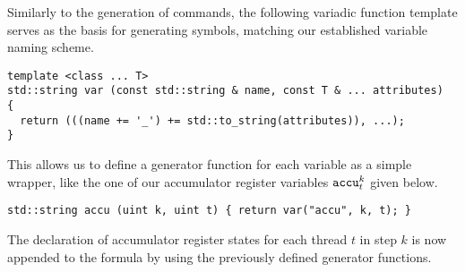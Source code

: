 
%

\noindent
Similarly to the generation of {\SMTLIB} commands, the following variadic function template serves as the basis for generating symbols, matching our established variable naming scheme.

\begin{lstlisting}[style=c++]
template <class ... T>
std::string var (const std::string & name, const T & ... attributes)
{
  return (((name += '_') += std::to_string(attributes)), ...);
}
\end{lstlisting}

\noindent
This allows us to define a generator function for each variable as a simple wrapper, %
like the one of our accumulator register variables $\texttt{accu}^k_t$ given below.



\begin{lstlisting}[style=c++]
std::string accu (uint k, uint t) { return var("accu", k, t); }
\end{lstlisting}

\noindent
The declaration of accumulator register states for each thread $t$ in step $k$ is now appended to the formula by using the previously defined generator functions.


